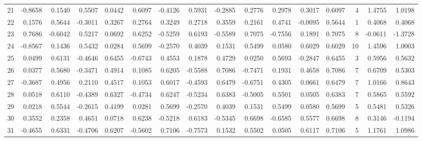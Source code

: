 \begin{tabular}{lrrrrrrrrrrrrrrr}
21  &     -0.8658 &  0.1540 &  0.5507 &  0.0442 &  0.6097 & -0.4126 &  0.5931 & -0.2885 &  0.2776 &  0.2978 &   0.3017 &     0.6097 &      4 &                    1.4755 &                     1.0198 \\
22  &      0.1576 &  0.5644 & -0.3011 &  0.3267 &  0.2764 &  0.3249 &  0.2718 &  0.3559 &  0.2161 &  0.4741 &  -0.0095 &     0.5644 &      1 &                    0.4068 &                     0.4068 \\
23  &      0.7686 & -0.6042 &  0.5217 &  0.0692 &  0.6252 & -0.5259 &  0.6193 & -0.5589 &  0.7075 & -0.7556 &   0.1891 &     0.7075 &      8 &                   -0.0611 &                    -1.3728 \\
24  &     -0.8567 &  0.1436 &  0.5432 &  0.0284 &  0.5699 & -0.2570 &  0.4039 &  0.1531 &  0.5499 &  0.0580 &   0.6029 &     0.6029 &     10 &                    1.4596 &                     1.0003 \\
25  &      0.0499 &  0.6131 & -0.4646 &  0.6455 & -0.6743 &  0.4553 &  0.1878 &  0.4729 &  0.0250 &  0.5693 &  -0.2847 &     0.6455 &      3 &                    0.5956 &                     0.5632 \\
26  &      0.0377 &  0.5680 & -0.3471 &  0.4914 &  0.1085 &  0.6205 & -0.5588 &  0.7086 & -0.7471 &  0.1931 &   0.4658 &     0.7086 &      7 &                    0.6709 &                     0.5303 \\
27  &     -0.3687 &  0.4956 &  0.2110 &  0.4517 &  0.1053 &  0.6017 & -0.4593 &  0.6479 & -0.6751 &  0.4305 &   0.0661 &     0.6479 &      7 &                    1.0166 &                     0.8643 \\
28  &      0.0518 &  0.6110 & -0.4389 &  0.6327 & -0.4734 &  0.6247 & -0.5234 &  0.6383 & -0.5005 &  0.5501 &   0.0505 &     0.6383 &      7 &                    0.5865 &                     0.5592 \\
29  &      0.0218 &  0.5544 & -0.2615 &  0.4199 &  0.0281 &  0.5699 & -0.2570 &  0.4039 &  0.1531 &  0.5499 &   0.0580 &     0.5699 &      5 &                    0.5481 &                     0.5326 \\
30  &      0.3552 &  0.2358 &  0.4651 &  0.0718 &  0.6238 & -0.5218 &  0.6183 & -0.5345 &  0.6698 & -0.6585 &   0.5577 &     0.6698 &      8 &                    0.3146 &                    -0.1194 \\
31  &     -0.4655 &  0.6331 & -0.4706 &  0.6207 & -0.5602 &  0.7106 & -0.7573 &  0.1532 &  0.5502 &  0.0505 &   0.6117 &     0.7106 &      5 &                    1.1761 &                     1.0986 \\

\end{tabular}
